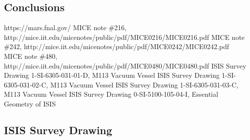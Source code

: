 \documentclass[a4paper,11pt]{article}
\begin{document}
\section{Conclusions}

\begin{thebibliography}{9}
 https://mars.fnal.gov/
 MICE note \#216, http://mice.iit.edu/micenotes/public/pdf/MICE0216/MICE0216.pdf
 MICE note \#242, http://mice.iit.edu/micenotes/public/pdf/MICE0242/MICE0242.pdf
 MICE note \#480, http://mice.iit.edu/micenotes/public/pdf/MICE0480/MICE0480.pdf
 ISIS Survey Drawing 1-SI-6305-031-01-D, M113 Vacuum Vessel
 ISIS Survey Drawing 1-SI-6305-031-02-C, M113 Vacuum Vessel
 ISIS Survey Drawing 1-SI-6305-031-03-C, M113 Vacuum Vessel
 ISIS Survey Drawing 0-SI-5100-105-04-I, Essential Geometry of ISIS

\end{thebibliography}

\begin{appendices}
\chapter{ISIS Survey Drawing}






\end{appendices}
\end{document}
